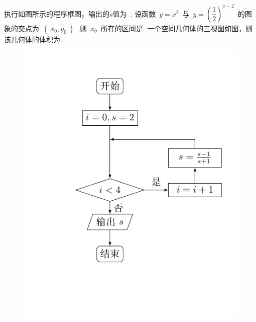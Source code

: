 \documentclass[printbox]{BHCexam}
\begin{document}
\begin{questions}
\question 执行如图所示的程序框图，输出的$s$值为~\xx.
\question 设函数~$y=x^3$~与~$y=\left(\dfrac{1}{2} \right)^{x-2}$~的图象的交点为~$(~x_0,y_0~)$~,则~$x_0$~所在的区间是\xx.
\question 一个空间几何体的三视图如图，则该几何体的体积为\xx.
\begin{figure}[!htb] 
\begin{minipage}[t]{0.5\textwidth}%
\vspace{-1cm}
\centering  
\includegraphics[scale=0.9]{liuchengtu.pdf}
\end{minipage}  
\begin{minipage}[t]{0.5\textwidth}  
\vspace{0cm}
\centering  

\end{minipage}
\end{figure}
\end{questions}
\end{document}
